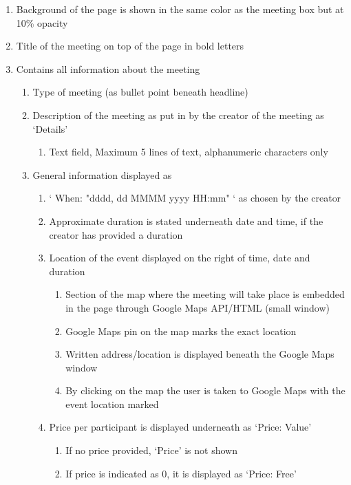 \documentclass[conference]{IEEEtran}
\begin{document}
\begin{enumerate}
    \item Background of the page is shown in the same color as the meeting box but at 10\% opacity
    \item Title of the meeting on top of the page in bold letters
    \item Contains all information about the meeting
    \begin{enumerate}
        \item Type of meeting (as bullet point beneath headline)
        \item Description of the meeting as put in by the creator of the meeting as ‘Details’
        \begin{enumerate}
            \item Text field, Maximum 5 lines of text, alphanumeric characters only
        \end{enumerate}
        \item General information displayed as
        \begin{enumerate}
            \item ‘ When: "dddd, dd MMMM yyyy HH:mm" ‘ as chosen by the creator
            \item Approximate duration is stated underneath date and time, if the creator has provided a duration
            \item Location of the event displayed on the right of time, date and duration
            \begin{enumerate}
                \item Section of the map where the meeting will take place is embedded in the page through Google Maps API/HTML (small window)
                \item Google Maps pin on the map marks the exact location
                \item Written address/location is displayed beneath the Google Maps window
                \item By clicking on the map the user is taken to Google Maps with the event location marked
            \end{enumerate}
            \item Price per participant is displayed underneath as ‘Price: Value’
            \begin{enumerate}
                \item If no price provided, ‘Price’ is not shown
                \item If price is indicated as 0, it is displayed as ‘Price: Free’

\end{enumerate}
\end{enumerate}
\end{enumerate}
\end{enumerate}
\end{document}

